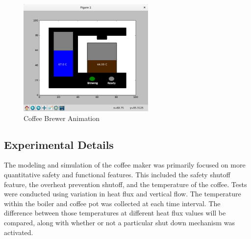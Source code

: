 \documentclass[10pt]{article}
\begin{document}
\begin{center}
  \begin{figure}[H]
    \begin{center}
      \includegraphics[width=0.6\textwidth]{input/animation}
      \caption{Coffee Brewer Animation}
      \label{ref:cofBreAni}
    \end{center}
  \end{figure}
\end{center}


\subsection{Experimental Details}
The modeling and simulation of the coffee maker was primarily focused on more quantitative safety and functional features. This included the safety shutoff feature, the overheat prevention shutoff, and the temperature of the coffee. Tests were conducted using variation in heat flux and vertical flow. The temperature within the boiler and coffee pot was collected at each time interval. The difference between those temperatures at different heat flux values will be compared, along with whether or not a particular shut down mechanism was activated.
\end{document}
